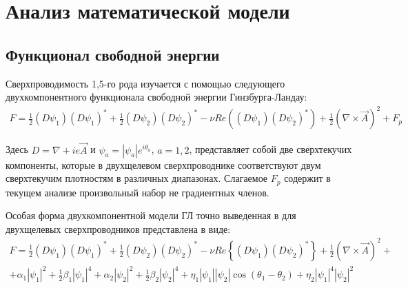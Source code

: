 \chapter{Анализ математической модели}

\section{Функционал свободной энергии}

Сверхпроводимость 1,5-го рода изучается с помощью следующего двухкомпонентного 
функционала свободной энергии Гинзбурга-Ландау:
\begin{gather}
    F = \frac{1}{2}(D\psi_1)(D\psi_1)^* + \frac{1}{2}(D\psi_2)(D\psi_2)^* - 
        \nu Re\left( (D\psi_1)(D\psi_2)^* \right) + 
        \frac{1}{2}\left(\nabla\times\vec{A}\right)^2 + F_p
    \label{eq:1}
\end{gather}

Здесь \( D = \nabla + ie\vec{A} \) и \( \psi_a = |\psi_a|e^{i\theta_a} \), 
\( a = 1,2 \), представляет собой две сверхтекучих компоненты, которые в 
двухщелевом сверхпроводнике соответствуют двум сверхтекучим плотностям в 
различных диапазонах. Слагаемое \( F_p \) содержит в текущем анализе 
произвольный набор не градиентных членов.

Особая форма двухкомпонентной модели ГЛ точно выведенная в
\cite{bib:8,bib:9,bib:10} для двухщелевых сверхпроводников представлена в виде:
\begin{gather}
    F = \frac{1}{2}(D\psi_1)(D\psi_1)^* + \frac{1}{2}(D\psi_2)(D\psi_2)^* - 
        \nu Re\left\{ (D\psi_1)(D\psi_2)^* \right\} + 
        \frac{1}{2}\left(\nabla\times\vec{A}\right)^2 + \nonumber \\
        + \alpha_1|\psi_1|^2 + \frac{1}{2}\beta_1|\psi_1|^4 + 
        \alpha_2|\psi_2|^2 + \frac{1}{2}\beta_2|\psi_2|^4 + 
        \eta_1|\psi_1||\psi_2| \cos(\theta_1-\theta_2) + 
        \eta_2|\psi_1|^4|\psi_2|^2
    \label{eq:2}
\end{gather}

